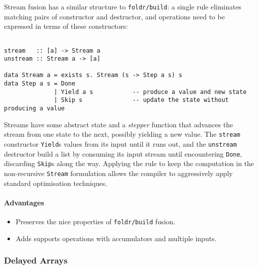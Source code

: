 Stream fusion has a similar structure to \texttt{foldr/build}: a single rule
eliminates matching pairs of constructor and destructor, and operations need to
be expressed in terms of these constructors:
%
\begin{lstlisting}[style=Haskell,numbers=none,mathescape,caption={The \emph{stream fusion} transformation}]
%\bf$\langle$ stream fusion $\rangle$% forall s. stream (unstream s) $\mapsto$ s

stream   :: [a] -> Stream a
unstream :: Stream a -> [a]

data Stream a = exists s. Stream (s -> Step a s) s
data Step a s = Done
              | Yield a s           -- produce a value and new state
              | Skip s              -- update the state without producing a value
\end{lstlisting}

Streams have some abstract state and a \emph{stepper} function that advances the
stream from one state to the next, possibly yielding a new value. The
\texttt{stream} constructor \texttt{Yield}s values from its input until it runs
out, and the \texttt{unstream} destructor build a list by consuming its input
stream until encountering \texttt{Done}, discarding \texttt{Skip}s along the
way. Applying the rule to keep the computation in the non-recursive
\texttt{Stream} formulation allows the compiler to aggressively apply standard
optimisation techniques.

\paragraph{Advantages}
\begin{itemize}
    \item Preserves the nice properties of \texttt{foldr/build} fusion.
    \item Adds supports operations with accumulators and multiple inputs.
\end{itemize}

%


\subsubsection{Delayed Arrays}


